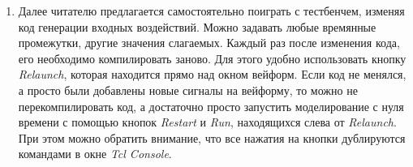 \begin{enumerate}


\item Далее читателю предлагается самостоятельно поиграть с тестбенчем, изменяя код генерации входных воздействий. Можно задавать любые времянные промежутки, другие значения слагаемых. Каждый раз после изменения кода, его необходимо компилировать заново. Для этого удобно использовать кнопку \emph{Relaunch}, которая находится прямо над окном вейформ. Если код не менялся, а просто были добавлены новые сигналы на вейформу, то можно не перекомпилировать код, а достаточно просто запустить моделирование с нуля времени с помощью кнопок \emph{Restart} и \emph{Run}, находящихся слева от \emph{Relaunch}. При этом можно обратить внимание, что все нажатия на кнопки дублируются командами в окне \emph{Tcl Console}.  

\end{enumerate}